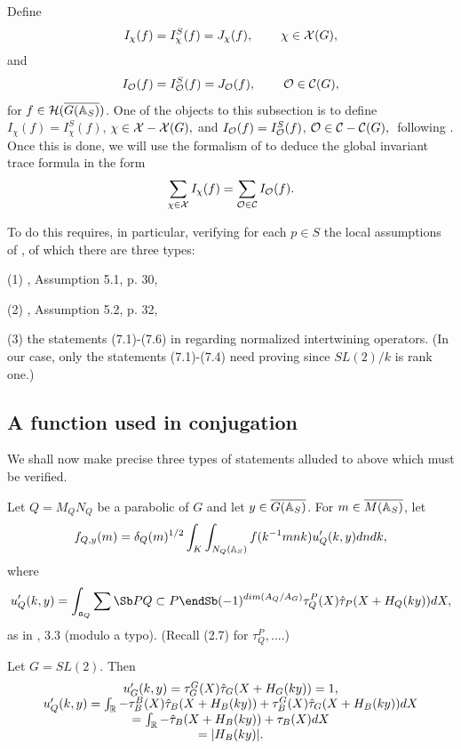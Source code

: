 Define 
\begin{equation}
I_\chi (f)=I_\chi ^S(f)=J_\chi (f),\;\;\;\;\;\;\;\;\chi \in {\cal{X}}(G),
\end{equation}
and 
\begin{equation}
I_{{\cal{O}}}(f)=I_{{\cal{O}}}^S(f)=J_{{\cal{O}}}(f),
\;\;\;\;\;\;\;\;{\cal{O}}\in {\cal C}(G),
\end{equation}
for $f\in {\cal{H}}(\overline{G({\Bbb{A}}_S)})$. One of the objects to this subsection
is to define $I_\chi (f)=I_\chi ^S(f)$,
$\chi \in {\cal{X}}-{\cal{X}}(G), $
and $I_{{\cal{O}}}(f)=I_{{\cal{O}}}^S(f)$,
${\cal{O}}\in {\cal C}-{\cal C}(G),\;$%
following \cite{A6}. Once this is done, we will use the formalism of
\cite{A6} to
deduce the global invariant trace formula in the form 
\begin{equation}
\sum_{\chi \in {\cal{X}}}I_\chi (f)=\sum_{{\cal{O}}\in {\cal C}}
I_{{\cal{O}}}(f).
\end{equation}

To do this requires, in particular, verifying for each $p\in S$ the local
assumptions of \cite{A6}, of which there are three types:

(1) \cite{A6}, Assumption 5.1, p. 30,

(2) \cite{A6}, Assumption 5.2, p. 32,

(3) the statements (7.1)-(7.6) in \cite{A6}
regarding normalized intertwining operators.
(In our case, only the statements (7.1)-(7.4) need proving since
$SL(2)/k$ is rank one.)

\subsection{A function used in conjugation}

We shall now make precise three types of statements alluded to
above which must be verified.

Let $Q=M_Q N_Q$ be a parabolic of $G$ and let
$y\in \overline{G({\Bbb{A}}_S)}$.
For $m\in \overline{M({\Bbb{A}}_S)}$, let
\begin{equation}
f_{Q,y}(m)=\delta_Q(m)^{1/2}\int_K\int_{N_Q({\Bbb{A}}_S)}
f(k^{-1}mnk)u'_Q(k,y)dndk,
\end{equation}
where
\[
u'_Q(k,y)=\int_{{\frak{a}}_Q}
\sum\Sb P \\Q\subset P\endSb
(-1)^{dim(A_Q/A_G)}
\tau_Q^P(X)\hat{\tau}_P(X+H_Q(ky))dX ,
\]
as in \cite{A6}, {3.3} (modulo a typo).
(Recall (2.7) for $\tau_Q^P,...$.)
\begin{example} Let $G=SL(2)$. Then
\[
\begin{array}{c}
u'_G(k,y)=\tau_G^G(X)\hat{\tau}_G(X+H_G(ky))=1,\\
u'_Q(k,y)=\int_{{\Bbb{R}}}
-\tau_B^B(X)\hat{\tau}_B(X+H_B(ky))
+\tau_B^G(X)\hat{\tau}_G(X+H_B(ky)) dX \\
=\int_{{\Bbb{R}}}
-\hat{\tau}_B(X+H_B(ky))+\tau_B(X)dX\\
=|H_B(ky)|.
\end{array}
\]
\end{example}

